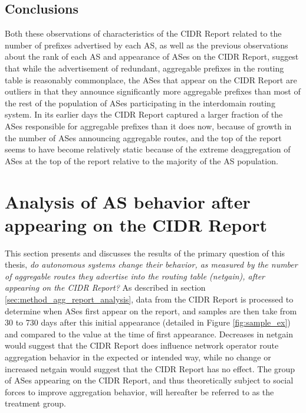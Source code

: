 
\subsection{Conclusions}

Both these observations of characteristics of the CIDR Report related to the
number of prefixes advertised by each AS, as well as the previous observations
about the rank of each AS and appearance of ASes on the CIDR Report, suggest
that while the advertisement of redundant, aggregable prefixes in the routing
table is reasonably commonplace, the ASes that appear on the CIDR Report are
outliers in that they announce significantly more aggregable prefixes than most
of the rest of the population of ASes participating in the interdomain routing
system. In its earlier days the CIDR Report captured a larger fraction of the
ASes responsible for aggregable prefixes than it does now, because of
growth in the number of ASes announcing aggregable routes, and the top of the
report seems to have become relatively static because of the extreme
deaggregation of ASes at the top of the report relative to the majority of the
AS population.

\section{Analysis of AS behavior after appearing on the CIDR Report}

This section presents and discusses the results of the primary question of this
thesis, \emph{do autonomous systems change their behavior, as measured by the
number of aggregable routes they advertise into the routing table (netgain),
after appearing on the CIDR Report?} As described in section
\ref{sec:method_agg_report_analysis}, data from the CIDR Report is processed to
determine when ASes first appear on the report, and samples are then take from
30 to 730 days after this initial appearance (detailed in Figure
\ref{fig:sample_ex}) and compared to the value at the time of first appearance.
Decreases in netgain would suggest that the CIDR Report does influence network
operator route aggregation behavior in the expected or intended way, while no
change or increased netgain would suggest that the CIDR Report has no effect.
The group of ASes appearing on the CIDR Report, and thus theoretically subject
to social forces to improve aggregation behavior, will hereafter be referred to
as the treatment group.

